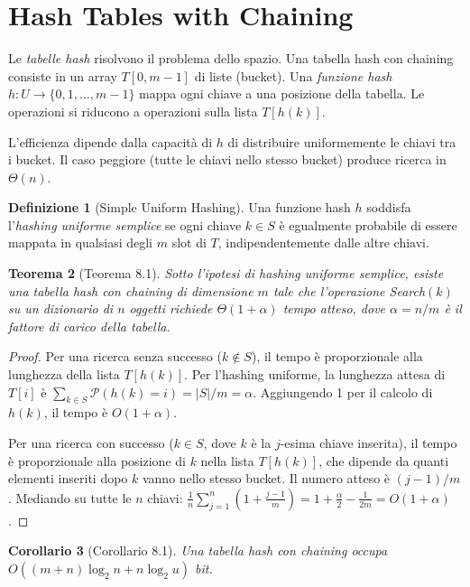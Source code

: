 \documentclass[12pt, a4paper, oneside]{book}
\theoremstyle{plain}
\newtheorem{teorema}{Teorema}[chapter]
\newtheorem{corollario}[teorema]{Corollario}
\theoremstyle{definition}
\newtheorem{definizione}[teorema]{Definizione}
\theoremstyle{remark}
\begin{document}
\section{Hash Tables with Chaining}

Le \emph{tabelle hash} risolvono il problema dello spazio. Una tabella hash con chaining consiste in un array $T[0, m-1]$ di liste (bucket). Una \emph{funzione hash} $h : U \to \{0, 1, \ldots, m-1\}$ mappa ogni chiave a una posizione della tabella. Le operazioni si riducono a operazioni sulla lista $T[h(k)]$.

L'efficienza dipende dalla capacità di $h$ di distribuire uniformemente le chiavi tra i bucket. Il caso peggiore (tutte le chiavi nello stesso bucket) produce ricerca in $\Theta(n)$.

\begin{definizione}[Simple Uniform Hashing]
Una funzione hash $h$ soddisfa l'\emph{hashing uniforme semplice} se ogni chiave $k \in S$ è egualmente probabile di essere mappata in qualsiasi degli $m$ slot di $T$, indipendentemente dalle altre chiavi.
\end{definizione}

\begin{teorema}[Teorema 8.1]
Sotto l'ipotesi di hashing uniforme semplice, esiste una tabella hash con chaining di dimensione $m$ tale che l'operazione Search$(k)$ su un dizionario di $n$ oggetti richiede $\Theta(1 + \alpha)$ tempo atteso, dove $\alpha = n/m$ è il \emph{fattore di carico} della tabella.
\end{teorema}

\begin{proof}
Per una ricerca senza successo ($k \notin S$), il tempo è proporzionale alla lunghezza della lista $T[h(k)]$. Per l'hashing uniforme, la lunghezza attesa di $T[i]$ è $\sum_{k \in S}\mathcal{P}(h(k) = i) = |S|/m = \alpha$. Aggiungendo 1 per il calcolo di $h(k)$, il tempo è $O(1 + \alpha)$.

Per una ricerca con successo ($k \in S$, dove $k$ è la $j$-esima chiave inserita), il tempo è proporzionale alla posizione di $k$ nella lista $T[h(k)]$, che dipende da quanti elementi inseriti dopo $k$ vanno nello stesso bucket. Il numero atteso è $(j-1)/m$. Mediando su tutte le $n$ chiavi:
$\frac{1}{n}\sum_{j=1}^n\left(1 + \frac{j-1}{m}\right) = 1 + \frac{\alpha}{2} - \frac{1}{2m} = O(1 + \alpha)$.
\end{proof}

\begin{corollario}[Corollario 8.1]
Una tabella hash con chaining occupa $O((m+n)\log_2 n + n\log_2 u)$ bit.
\end{corollario}
\end{document}
